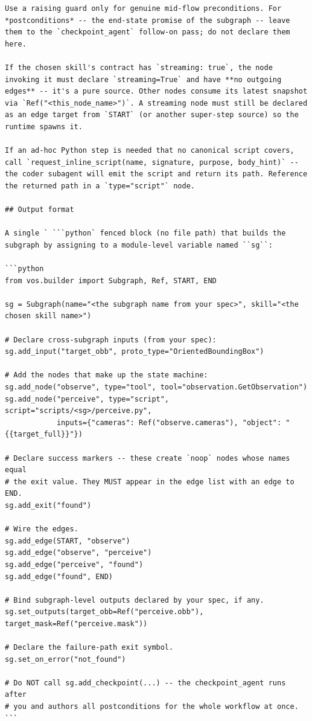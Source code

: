 \begin{lstlisting}
Use a raising guard only for genuine mid-flow preconditions. For *postconditions* -- the end-state promise of the subgraph -- leave them to the `checkpoint_agent` follow-on pass; do not declare them here.

If the chosen skill's contract has `streaming: true`, the node invoking it must declare `streaming=True` and have **no outgoing edges** -- it's a pure source. Other nodes consume its latest snapshot via `Ref("<this_node_name>")`. A streaming node must still be declared as an edge target from `START` (or another super-step source) so the runtime spawns it.

If an ad-hoc Python step is needed that no canonical script covers, call `request_inline_script(name, signature, purpose, body_hint)` -- the coder subagent will emit the script and return its path. Reference the returned path in a `type="script"` node.

## Output format

A single ` ```python` fenced block (no file path) that builds the
subgraph by assigning to a module-level variable named ``sg``:

```python
from vos.builder import Subgraph, Ref, START, END

sg = Subgraph(name="<the subgraph name from your spec>", skill="<the chosen skill name>")

# Declare cross-subgraph inputs (from your spec):
sg.add_input("target_obb", proto_type="OrientedBoundingBox")

# Add the nodes that make up the state machine:
sg.add_node("observe", type="tool", tool="observation.GetObservation")
sg.add_node("perceive", type="script", script="scripts/<sg>/perceive.py",
            inputs={"cameras": Ref("observe.cameras"), "object": "{{target_full}}"})

# Declare success markers -- these create `noop` nodes whose names equal
# the exit value. They MUST appear in the edge list with an edge to END.
sg.add_exit("found")

# Wire the edges.
sg.add_edge(START, "observe")
sg.add_edge("observe", "perceive")
sg.add_edge("perceive", "found")
sg.add_edge("found", END)

# Bind subgraph-level outputs declared by your spec, if any.
sg.set_outputs(target_obb=Ref("perceive.obb"), target_mask=Ref("perceive.mask"))

# Declare the failure-path exit symbol.
sg.set_on_error("not_found")

# Do NOT call sg.add_checkpoint(...) -- the checkpoint_agent runs after
# you and authors all postconditions for the whole workflow at once.
```


\end{lstlisting}
